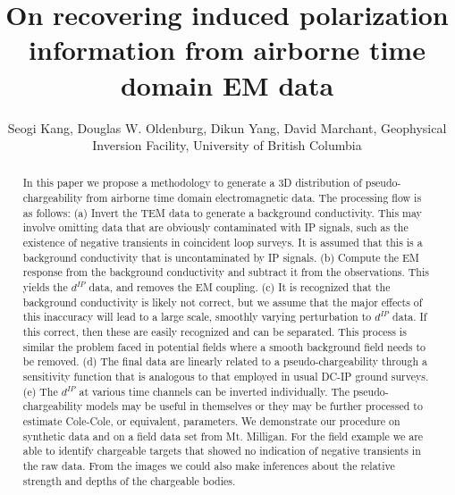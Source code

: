 \documentclass{segabs}
\begin{document}
\title{On recovering induced polarization information from airborne time domain EM data}

\renewcommand{\thefootnote}{\fnsymbol{footnote}}

\author{Seogi Kang\footnotemark[1], Douglas W. Oldenburg, Dikun Yang, David Marchant, Geophysical Inversion Facility, University of British Columbia}


\maketitle
\begin{abstract}
In this paper we propose a methodology to generate a 3D distribution of pseudo-chargeability from airborne time domain electromagnetic data. The processing flow is as follows: (a) Invert the TEM data to generate a background conductivity. This may involve omitting data that are obviously contaminated with IP signals, such as the existence of negative transients in coincident loop surveys. It is assumed that this is a background conductivity that is uncontaminated by IP signals. (b) Compute the EM response from the background conductivity and subtract it from the observations. This yields the $d^{IP}$ data, and removes the EM coupling. (c) It is recognized that the background conductivity is likely not correct, but we assume that the major effects of this inaccuracy will lead to a large scale, smoothly varying perturbation to $d^{IP}$ data. If this correct, then these are easily recognized and can be separated. This process is similar the problem faced in potential fields where a smooth background field needs to be removed. (d) The final data are linearly related to a pseudo-chargeability through a sensitivity function that is analogous to that employed in usual DC-IP ground surveys. (e) The $d^{IP}$ at various time channels can be inverted individually. The pseudo-chargeability models may be useful in themselves or they may be further processed to estimate Cole-Cole, or equivalent, parameters. We demonstrate our procedure on synthetic data and on a field data set from Mt. Milligan. For the field example we are able to identify chargeable targets that showed no indication of negative transients in the raw data. From the images we could also make inferences about the relative strength and depths of the chargeable bodies.
\end{abstract}
\renewcommand{\figdir}{Fig} %
\end{document}
